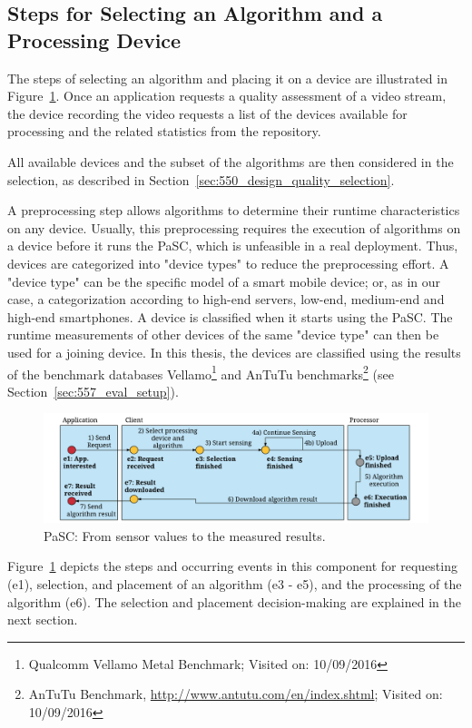\subsection{Steps for Selecting an Algorithm and a Processing Device}
The steps of selecting an algorithm and placing it on a device are illustrated in Figure~\ref{fig:555_steps}.
Once an application requests a quality assessment of a video stream, the device recording the video requests a list of the devices available for processing and the related statistics from the repository.

All available devices and the subset of the algorithms are then considered in the selection, as described in Section~\ref{sec:550_design_quality_selection}.

A preprocessing step allows algorithms to determine their runtime characteristics on any device.
Usually, this preprocessing requires the execution of algorithms on a device before it runs the \ac{PaSC}, which is unfeasible in a real deployment.
Thus, devices are categorized into "device types" to reduce the preprocessing effort.
A "device type" can be the specific model of a smart mobile device; or, as in our case, a categorization according to high-end servers, low-end, medium-end and high-end smartphones.
A device is classified when it starts using the \ac{PaSC}.
The runtime measurements of other devices of the same "device type" can then be used for a joining device.
In this thesis, the devices are classified using the results of the benchmark databases Vellamo\footnote{Qualcomm Vellamo Metal Benchmark; Visited on: 10/09/2016} and AnTuTu benchmarks\footnote{AnTuTu Benchmark, \url{http://www.antutu.com/en/index.shtml}; Visited on: 10/09/2016} (see Section~\ref{sec:557_eval_setup}).

\begin{figure}[!htb]
\centering
    \includegraphics[width=\linewidth]{gfx/550_QA/fromRequestToReceive}
    \caption{\ac{PaSC}: From sensor values to the measured results.}
    \label{fig:555_steps}
\end{figure}
Figure~\ref{fig:555_steps} depicts the steps and occurring events in this component for requesting (e1), selection, and placement of an algorithm (e3 - e5), and the processing of the algorithm (e6).
The selection and placement decision-making are explained in the next section.
